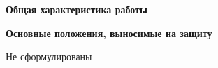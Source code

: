\documentclass{article}
\begin{document}
    \Large

    \pagestyle{empty}
    

    

    \newpage
    
    \pagestyle{plain}

    \newpage
    \begin{center}
        \textbf{Общая характеристика работы}
    \end{center}
    

    

    

    

    

    

    \textbf{Основные положения, выносимые на защиту}
    
    Не сформулированы

    

    

    

    

    

    

    

    

    
\end{document}
